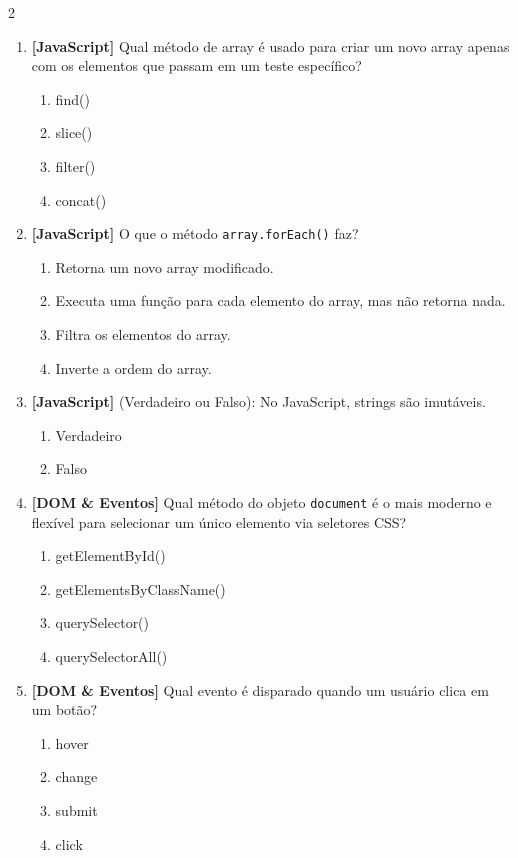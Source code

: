 \documentclass[a4paper,10pt]{article}
\begin{document}
\begin{multicols*}{2}
\begin{enumerate}[label=\textbf{\arabic*.}, resume, leftmargin=*]
\item \textbf{[JavaScript]} Qual método de array é usado para criar um novo array apenas com os elementos que passam em um teste específico?
\begin{enumerate}[label=(\alph*), noitemsep]
  \item find()
  \item slice()
  \item filter()
  \item concat()
\end{enumerate}

\item \textbf{[JavaScript]} O que o método \texttt{array.forEach()} faz?
\begin{enumerate}[label=(\alph*), noitemsep]
  \item Retorna um novo array modificado.
  \item Executa uma função para cada elemento do array, mas não retorna nada.
  \item Filtra os elementos do array.
  \item Inverte a ordem do array.
\end{enumerate}

\item \textbf{[JavaScript]} (Verdadeiro ou Falso): No JavaScript, strings são imutáveis.
\begin{enumerate}[label=(\alph*), noitemsep]
  \item Verdadeiro
  \item Falso
\end{enumerate}

\item \textbf{[DOM \& Eventos]} Qual método do objeto \texttt{document} é o mais moderno e flexível para selecionar um único elemento via seletores CSS?
\begin{enumerate}[label=(\alph*), noitemsep]
  \item getElementById()
  \item getElementsByClassName()
  \item querySelector()
  \item querySelectorAll()
\end{enumerate}

\item \textbf{[DOM \& Eventos]} Qual evento é disparado quando um usuário clica em um botão?
\begin{enumerate}[label=(\alph*), noitemsep]
  \item hover
  \item change
  \item submit
  \item click
\end{enumerate}


\end{enumerate}
\end{multicols*}
\end{document}
